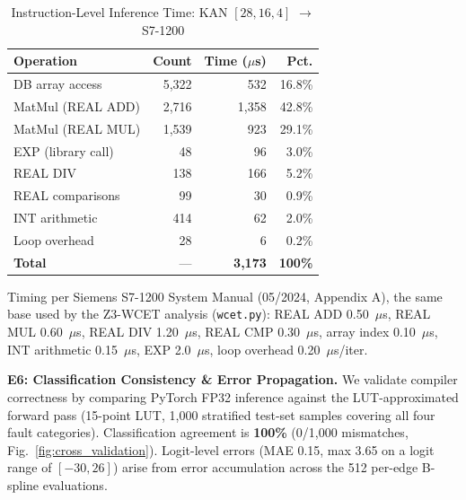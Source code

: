 \documentclass[journal,onecolumn]{IEEEtran}
\begin{document}
\begin{table}[t]
\centering
\caption{Instruction-Level Inference Time: KAN $[28,16,4]$ $\to$ S7-1200}
\label{tab:instr_timing}
\footnotesize
\begin{tabular}{@{}lrrr@{}}
\toprule
\textbf{Operation} & \textbf{Count} & \textbf{Time ($\mu$s)} & \textbf{Pct.} \\
\midrule
DB array access      & 5,322 & 532 & 16.8\% \\
MatMul (REAL ADD)    & 2,716 & 1,358 & 42.8\% \\
MatMul (REAL MUL)    & 1,539 & 923 & 29.1\% \\
EXP (library call)   & 48    & 96  &  3.0\% \\
REAL DIV             & 138   & 166 &  5.2\% \\
REAL comparisons     & 99    & 30  &  0.9\% \\
INT arithmetic       & 414   & 62  &  2.0\% \\
Loop overhead        & 28    & 6   &  0.2\% \\
\midrule
\textbf{Total}       & ---   & \textbf{3,173} & \textbf{100\%} \\
\bottomrule
\end{tabular}
\vspace{1pt}
{\scriptsize Timing per Siemens S7-1200 System Manual (05/2024, Appendix A),
the same base used by the Z3-WCET analysis (\texttt{wcet.py}): REAL ADD
0.50~$\mu$s, REAL MUL 0.60~$\mu$s, REAL DIV 1.20~$\mu$s, REAL CMP
0.30~$\mu$s, array index 0.10~$\mu$s, INT arithmetic 0.15~$\mu$s, EXP
2.0~$\mu$s, loop overhead 0.20~$\mu$s/iter.}
\end{table}

\noindent\textbf{E6: Classification Consistency \& Error Propagation.}
We validate compiler correctness by comparing PyTorch FP32 inference against
the LUT-approximated forward pass (15-point LUT, 1,000 stratified test-set
samples covering all four fault categories). Classification agreement is
\textbf{100\%} (0/1,000 mismatches, Fig.~\ref{fig:cross_validation}).
Logit-level errors (MAE 0.15, max 3.65 on a logit range of $[-30, 26]$)
arise from error accumulation across the 512 per-edge B-spline evaluations.
\end{document}

